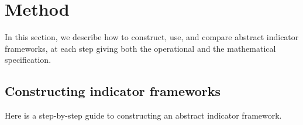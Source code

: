 \documentclass{article}
\theoremstyle{definition}
\newcommand{\redout}[1]{{\color{red}#1}}
\begin{document}


\section{Method}
In this section, we describe how to construct, use, and compare abstract indicator frameworks, at each step giving both the operational and the mathematical specification.

\subsection{Constructing indicator frameworks}
Here is a step-by-step guide to constructing an abstract indicator framework.
\end{document}
